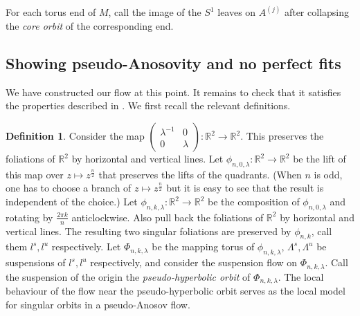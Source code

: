 \documentclass[12pt]{amsart}
\theoremstyle{definition}
\newtheorem{defn}[thm]{Definition}
\numberwithin{equation}{section}
\begin{document}
For each torus end of $M$, call the image of the $S^1$ leaves on $A^{(j)}$ after collapsing the \textit{core orbit} of the corresponding end.

\subsection{Showing pseudo-Anosovity and no perfect fits} \label{subsec:pAproof}

We have constructed our flow at this point. It remains to check that it satisfies the properties described in . We first recall the relevant definitions.

\begin{defn} \label{defn:phorbit}
Consider the map $\begin{pmatrix} \lambda^{-1} & 0\\ 0 & \lambda \end{pmatrix}: \mathbb{R}^2 \to \mathbb{R}^2$. This preserves the foliations of $\mathbb{R}^2$ by horizontal and vertical lines. Let $\phi_{n,0,\lambda}:\mathbb{R}^2 \to \mathbb{R}^2$ be the lift of this map over $z \mapsto z^{\frac{n}{2}}$ that preserves the lifts of the quadrants. (When $n$ is odd, one has to choose a branch of $z \mapsto z^{\frac{n}{2}}$ but it is easy to see that the result is independent of the choice.) Let $\phi_{n,k, \lambda}: \mathbb{R}^2 \to \mathbb{R}^2$ be the composition of $\phi_{n,0,\lambda}$ and rotating by $\frac{2\pi k}{n}$ anticlockwise. Also pull back the foliations of $\mathbb{R}^2$ by horizontal and vertical lines. The resulting two singular foliations are preserved by $\phi_{n,k}$, call them $l^s, l^u$ respectively. Let $\Phi_{n,k,\lambda}$ be the mapping torus of $\phi_{n,k, \lambda}$, $\Lambda^s, \Lambda^u$ be suspensions of $l^s, l^u$ respectively, and consider the suspension flow on $\Phi_{n,k, \lambda}$. Call the suspension of the origin the \textit{pseudo-hyperbolic orbit} of $\Phi_{n,k,\lambda}$. The local behaviour of the flow near the pseudo-hyperbolic orbit serves as the local model for singular orbits in a pseudo-Anosov flow.
\end{defn}
\end{document}
